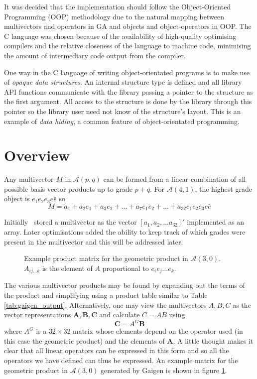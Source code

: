 It was decided that the implementation should follow the 
Object-Oriented Programming (OOP) methodology due to the natural mapping
between multivectors and operators in GA and objects and object-operators
in OOP. The C language was chosen because of the availability of high-quality 
optimising compilers and the relative closeness of the language to machine 
code, minimising the amount of intermediary code output from the compiler.

One way in the C language of writing object-orientated programs is to make
use of \emph{opaque data structures}. An internal structure type is defined
and all library API functions communicate
with the library passing a 
pointer to the structure as the first argument. All access to the
structure is done by the library through this pointer so the library
user need not know of the structure's layout. This is an example
of \emph{data hiding}, a common feature of object-orientated programming.

\section{Overview}


Any multivector $M$ in $\mathcal{A}(p,q)$ can be formed from a linear
combination of all possible basis vector products up to grade $p+q$. For
$\mathcal{A}(4,1)$, the highest grade object is $e_1e_2e_3e\bar{e}$ so \[ M =
a_1 + a_2 e_1 + a_3 e_2 + ... + a_7 e_1e_2 + ... + a_{32} e_1e_2e_3e\bar{e} \]

Initially \libcga\ stored a multivector as the vector $[ a_1, a_2, ...
a_{32} ]'$ implemented as an array. Later optimisations added the ability to
keep track of which grades were present in the multivector and this will be
addressed later.

\begin{figure}
\centering

\caption{Example product matrix for the geometric product in
$\mathcal{A}(3,0)$. $A_{ij...k}$ is the element of $A$ proportional to
$e_ie_j...e_k$.\label{fig:gaigen_matrix}}
\end{figure}

The various multivector products may be found by expanding out the terms of the
product and simplifying using a product table similar to Table
\ref{tab:gaigen_output}.  Alternatively, one may view the multivectors $A, B,
C$ as the vector representations $\mathbf{A}, \mathbf{B}, \mathbf{C}$ and
calculate $C = AB$ using \[ \mathbf{C} = A^{G} \mathbf{B} \] where $A^G$ is a
$32 \times 32$ matrix whose elements depend on the operator used (in this case
the geometric product) and the elements of $\mathbf{A}$. A little thought makes
it clear that all linear operators can be expressed in this form and so all the
operators we have defined can thus be expressed. An example matrix for the
geometric product in $\mathcal{A}(3,0)$ generated by Gaigen is shown in figure
\ref{fig:gaigen_matrix}.

